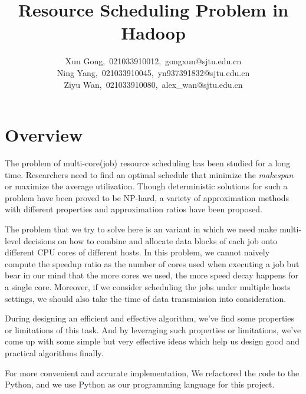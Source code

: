 \documentclass{llncs}
\title{Resource Scheduling Problem in Hadoop}
\subtitle{\color{blue}{Project for Algorithm Design and Analysis} \vspace{-6mm}}
\author{
Xun Gong,\ 021033910012,\ gongxun@sjtu.edu.cn\\
Ning Yang,\ 021033910045,\ yn937391832@sjtu.edu.cn\\
Ziyu Wan,\ 021033910080,\ alex\_wan@sjtu.edu.cn
}
\institute{Department of Computer Science and Engineering, \\ Shanghai Jiao Tong University, Shanghai, China}
\begin{document}


\maketitle

\section*{Overview}

The problem of multi-core(job) resource scheduling has been studied for a long time. Researchers need to find an optimal schedule that minimize the \textit{makespan} or maximize the average utilization.
Though deterministic solutions for such a problem have been proved to be NP-hard, a variety of approximation methods with different properties and approximation ratios have been proposed.

The problem that we try to solve here is an variant in which we need make multi-level decisions on how to combine and allocate data blocks of each job onto different CPU cores of different hosts. In this problem, we cannot naively compute the speedup ratio as the number of cores used when executing a job but bear in our mind that the more cores we used, the more speed decay happens for a single core. Moreover, if we consider scheduling the jobs under multiple hosts settings, we should also take the time of data transmission into consideration.

During designing an efficient and effective algorithm, we've find some properties or limitations of this task. And by leveraging such properties or limitations, we've come up with some simple but very effective ideas which help us design good and practical algorithms finally.

For more convenient and accurate implementation, We refactored the code to the Python, and we use Python as our programming language for this project.
\end{document}
